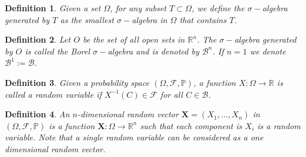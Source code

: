 \documentclass{sfuthesis}
\newtheorem{definition}{Definition}
\newcommand{\p}{\mathbb{P}}
\begin{document}
\begin{definition}
Given a set $\Omega$, for any subset $T\subset\Omega$, we define the $\sigma-$algebra generated by $T$ as
the smallest $\sigma-$algebra in $\Omega$ that contains $T$.
\end{definition}

\begin{definition}
Let $O$ be the set of all open sets in $\mathbb{R}^{n}$. The $\sigma-$algebra generated by $O$ is called
the Borel $\sigma-$algebra and is denoted by $\mathcal{B}^{n}$. If $n=1$ we denote 
$\mathcal{B}^{1}:=\mathcal{B}$.
\end{definition}

\begin{definition}
Given a probability space $(\Omega,\mathscr{F},\p)$, a function $X:\Omega\rightarrow\mathbb{R}$ is called 
a random variable
if $X^{-1}(C)\in\mathscr{F}$ for all $C\in\mathcal{B}$.
\end{definition}

\begin{definition}
 An $n$-dimensional random vector $\textbf{X}=(X_{1},\ldots,X_{n})$ in $(\Omega,\mathscr{F},\p)$ 
is a function $\textbf{X}:\Omega\rightarrow\mathbb{R}^{n}$ such that each component is $X_{i}$ is a random variable. 
Note that a single random variable can be considered as a one dimensional random vector.
\end{definition}
\end{document}
